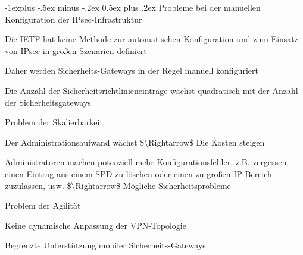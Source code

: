\documentclass[a4paper]{article}
\makeatletter
\renewcommand{\subsection}{\@startsection{subsection}{2}{0mm}%
 {-1explus -.5ex minus -.2ex}%
 {0.5ex plus .2ex}%
 {\normalfont\normalsize\bfseries}}
\makeatother
\begin{document}
\begin{multicols}{3}
\begin{itemize*}
            \subsection{Probleme bei der manuellen Konfiguration der
                  IPsec-Infrastruktur}
            \begin{itemize*}
                  \item       Die IETF hat keine Methode zur automatischen Konfiguration und zum
                  Einsatz von IPsec in großen Szenarien definiert
                  \item       Daher werden Sicherheits-Gateways in der Regel manuell konfiguriert
                  \begin{itemize*}
                        \item Die Anzahl der Sicherheitsrichtlinieneinträge wächst quadratisch mit der Anzahl der Sicherheitsgateways
                        \item Problem der Skalierbarkeit
                        \begin{itemize*} \item Der Administrationsaufwand wächst \$\textbackslash Rightarrow\$ Die Kosten steigen \item Administratoren machen potenziell mehr Konfigurationsfehler, z.B. vergessen, einen Eintrag aus einem SPD zu löschen oder einen zu großen IP-Bereich zuzulassen, usw. \$\textbackslash Rightarrow\$ Mögliche Sicherheitsprobleme \end{itemize*}
                  \end{itemize*}
                  \item       Problem der Agilität
                  \begin{itemize*}
                        \item Keine dynamische Anpassung der VPN-Topologie
                        \item Begrenzte Unterstützung mobiler Sicherheits-Gateways
                  \end{itemize*}
            \end{itemize*}


\end{itemize*}
\end{multicols}
\end{document}
